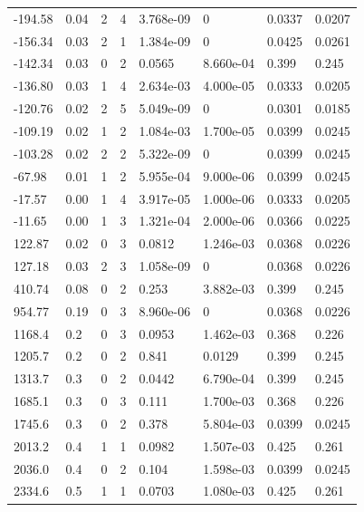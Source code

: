 \documentclass[preview]{standalone}
\begin{document}
{{\begin{tabular}{L{1.2cm}C{1.2cm} C{0.3cm}C{0.5cm} C{1.4cm}C{1.4cm} C{1.4cm}C{1.4cm}}
  -194.58  &  0.04  & 2     &  4 &  3.768e-09  & 0  & 0.0337 &  0.0207   \\ 
  -156.34  &  0.03  & 2     &  1 &  1.384e-09  & 0  & 0.0425 &  0.0261   \\ 
  -142.34  &  0.03  & 0     &  2 &  0.0565  & 8.660e-04  & 0.399 &  0.245   \\ 
  -136.80  &  0.03  & 1     &  4 &  2.634e-03  & 4.000e-05  & 0.0333 &  0.0205   \\ 
  -120.76  &  0.02  & 2     &  5 &  5.049e-09  & 0  & 0.0301 &  0.0185   \\ 
  -109.19  &  0.02  & 1     &  2 &  1.084e-03  & 1.700e-05  & 0.0399 &  0.0245   \\ 
  -103.28  &  0.02  & 2     &  2 &  5.322e-09  & 0  & 0.0399 &  0.0245   \\ 
  -67.98  &  0.01  & 1     &  2 &  5.955e-04  & 9.000e-06  & 0.0399 &  0.0245   \\ 
  -17.57  &  0.00  & 1     &  4 &  3.917e-05  & 1.000e-06  & 0.0333 &  0.0205   \\ 
  -11.65  &  0.00  & 1     &  3 &  1.321e-04  & 2.000e-06  & 0.0366 &  0.0225   \\ 
  122.87  &  0.02  & 0     &  3 &  0.0812  & 1.246e-03  & 0.0368 &  0.0226   \\ 
  127.18  &  0.03  & 2     &  3 &  1.058e-09  & 0  & 0.0368 &  0.0226   \\ 
  410.74  &  0.08  & 0     &  2 &  0.253  & 3.882e-03  & 0.399 &  0.245   \\ 
  954.77  &  0.19  & 0     &  3 &  8.960e-06  & 0  & 0.0368 &  0.0226   \\ 
  1168.4  &   0.2  & 0     &  3 &  0.0953  & 1.462e-03  & 0.368 &  0.226   \\ 
  1205.7  &   0.2  & 0     &  2 &  0.841  & 0.0129  & 0.399 &  0.245   \\ 
  1313.7  &   0.3  & 0     &  2 &  0.0442  & 6.790e-04  & 0.399 &  0.245   \\ 
  1685.1  &   0.3  & 0     &  3 &  0.111  & 1.700e-03  & 0.368 &  0.226   \\ 
  1745.6  &   0.3  & 0     &  2 &  0.378  & 5.804e-03  & 0.0399 &  0.0245   \\ 
  2013.2  &   0.4  & 1     &  1 &  0.0982  & 1.507e-03  & 0.425 &  0.261   \\ 
  2036.0  &   0.4  & 0     &  2 &  0.104  & 1.598e-03  & 0.0399 &  0.0245   \\ 
  2334.6  &   0.5  & 1     &  1 &  0.0703  & 1.080e-03  & 0.425 &  0.261   \\ 

\end{tabular}}}
\end{document}
